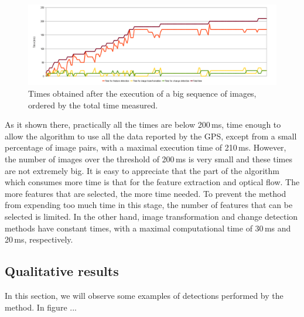 \begin{figure}[h!]
\centering
\includegraphics[width=\textwidth]{times}
\caption{Times obtained after the execution of a big sequence of images, ordered by the total time measured.}\label{fig:cp02_times}
\end{figure}

As it shown there, practically all the times are below 200\,ms, time enough to allow the algorithm to use all the data reported by the \ac{GPS}, except from a small percentage of image pairs, with a maximal execution time of 210\,ms. However, the number of images over the threshold of 200\,ms is very small and these times are not extremely big. It is easy to appreciate that the part of the algorithm which consumes more time is that for the feature extraction and optical flow. The more features that are selected, the more time needed. To prevent the method from expending too much time in this stage, the number of features that can be selected is limited. In the other hand, image transformation and change detection methods have constant times, with a maximal computational time of 30\,ms and 20\,ms, respectively.

\subsection{Qualitative results}\label{ch:chapter02_02_04}

In this section, we will observe some examples of detections performed by the method. In figure ... %

